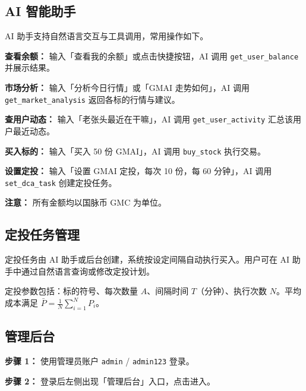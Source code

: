 \documentclass[12pt,a4paper]{article}
\begin{document}
\subsection{AI 智能助手}

AI 助手支持自然语言交互与工具调用，常用操作如下。

\textbf{查看余额：} 输入「查看我的余额」或点击快捷按钮，AI 调用 \texttt{get\_user\_balance} 并展示结果。

\textbf{市场分析：} 输入「分析今日行情」或「GMAI 走势如何」，AI 调用 \texttt{get\_market\_analysis} 返回各标的行情与建议。

\textbf{查用户动态：} 输入「老张头最近在干嘛」，AI 调用 \texttt{get\_user\_activity} 汇总该用户最近动态。

\textbf{买入标的：} 输入「买入 50 份 GMAI」，AI 调用 \texttt{buy\_stock} 执行交易。

\textbf{设置定投：} 输入「设置 GMAI 定投，每次 10 份，每 60 分钟」，AI 调用 \texttt{set\_dca\_task} 创建定投任务。

\textbf{注意：} 所有金额均以国脉币 GMC 为单位。

\subsection{定投任务管理}

定投任务由 AI 助手或后台创建，系统按设定间隔自动执行买入。用户可在 AI 助手中通过自然语言查询或修改定投计划。

定投参数包括：标的符号、每次数量 $A$、间隔时间 $T$（分钟）、执行次数 $N$。平均成本满足 $\bar{P} = \frac{1}{N}\sum_{i=1}^{N} P_i$。

\subsection{管理后台}

\textbf{步骤 1：} 使用管理员账户 \texttt{admin} / \texttt{admin123} 登录。

\textbf{步骤 2：} 登录后左侧出现「管理后台」入口，点击进入。
\end{document}
